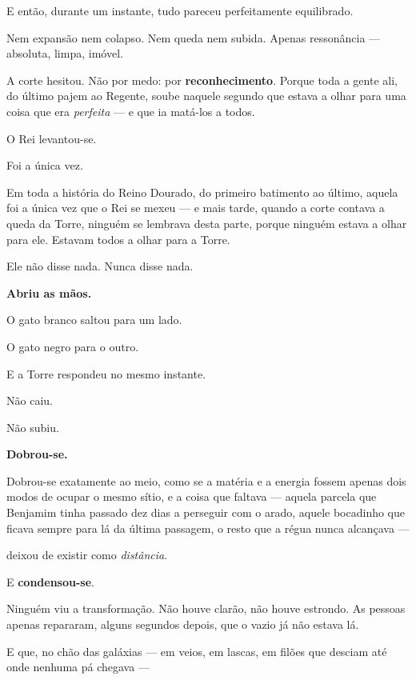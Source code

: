 \documentclass[livro.tex]{subfiles}
\begin{document}
\medskip

E então, durante um instante, tudo pareceu perfeitamente equilibrado.

Nem expansão nem colapso. Nem queda nem subida. Apenas ressonância --- absoluta, limpa, imóvel.

A corte hesitou. Não por medo: por \textbf{reconhecimento}. Porque toda a gente ali, do último pajem ao Regente,
soube naquele segundo que estava a olhar para uma coisa que era \emph{perfeita} --- e que ia matá-los a todos.

\medskip

O Rei levantou-se.

\medskip

Foi a única vez.

Em toda a história do Reino Dourado, do primeiro batimento ao último, aquela foi a única vez que o Rei se mexeu ---
e mais tarde, quando a corte contava a queda da Torre, ninguém se lembrava desta parte, porque ninguém estava a
olhar para ele. Estavam todos a olhar para a Torre.

Ele não disse nada. Nunca disse nada.

\textbf{Abriu as mãos.}

\medskip

O gato branco saltou para um lado.

O gato negro para o outro.

\medskip

E a Torre respondeu no mesmo instante.

Não caiu.

Não subiu.

\textbf{Dobrou-se.}

\medskip

Dobrou-se exatamente ao meio, como se a matéria e a energia fossem apenas dois modos de ocupar o mesmo sítio, e a
coisa que faltava --- aquela parcela que Benjamim tinha passado dez dias a perseguir com o arado, aquele
bocadinho que ficava sempre para lá da última passagem, o resto que a régua nunca alcançava ---

deixou de existir como \emph{distância}.

E \textbf{condensou-se}.

\medskip

Ninguém viu a transformação. Não houve clarão, não houve estrondo. As pessoas apenas repararam, alguns segundos
depois, que o vazio já não estava lá.

E que, no chão das galáxias --- em veios, em lascas, em filões que desciam até onde nenhuma pá chegava ---
\end{document}
